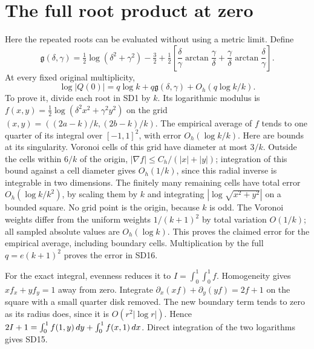 \documentclass[11pt]{article}
\begin{document}
\section{The full root product at zero}
Here the repeated roots can be evaluated without using a metric limit.
Define
\begin{equation}\tag{SD15}
\mathfrak g(\delta,\gamma)=
\tfrac12\log(\delta^2+\gamma^2)-\tfrac32
+\tfrac12\left[\frac\delta\gamma\arctan\frac\gamma\delta
+\frac\gamma\delta\arctan\frac\delta\gamma\right].
\end{equation}
At every fixed original multiplicity,
\begin{equation}\tag{SD16}
\boxed{\log|Q(0)|=q\log k+q\mathfrak g(\delta,\gamma)
+O_h(q\log k/k).}
\end{equation}
To prove it, divide each root in SD1 by $k$. Its logarithmic modulus is
$f(x,y)=\tfrac12\log(\delta^2x^2+\gamma^2y^2)$ on the grid
$(x,y)=((2a-k)/k,(2b-k)/k)$. The empirical average of $f$ tends to
one quarter of its integral over $[-1,1]^2$, with error
$O_h(\log k/k)$. Here are bounds at its singularity. Voronoi cells
of this grid have diameter at most $3/k$. Outside the cells within
$6/k$ of the origin, $|\nabla f|\le C_h/(|x|+|y|)$; integration
of this bound against a cell diameter gives $O_h(1/k)$, since this
radial inverse is integrable in two dimensions. The finitely many
remaining cells have total error $O_h(\log k/k^2)$, by scaling them
by $k$ and integrating $|\log\sqrt{x^2+y^2}|$ on a bounded square.
No grid point is the origin, because $k$ is odd. The Voronoi weights
differ from the uniform weights $1/(k+1)^2$ by total variation
$O(1/k)$; all sampled absolute values are $O_h(\log k)$. This proves
the claimed error for the empirical average, including boundary cells.
Multiplication by the full $q=e(k+1)^2$ proves the error in SD16.

For the exact integral, evenness reduces it to $I=\int_0^1\int_0^1f$.
Homogeneity gives $xf_x+yf_y=1$ away from zero. Integrate
$\partial_x(xf)+\partial_y(yf)=2f+1$ on the square with a small
quarter disk removed. The new boundary term tends to zero as its
radius does, since it is $O(r^2|\log r|)$. Hence
$2I+1=\int_0^1f(1,y)\,d y+\int_0^1f(x,1)\,d x$.
Direct integration of the two logarithms gives SD15.
\end{document}
